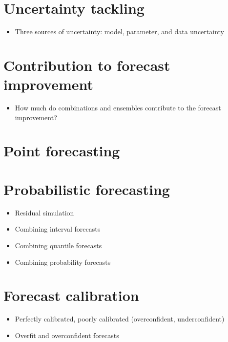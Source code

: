 \documentclass[11pt]{article}
\begin{document}
\section{Uncertainty tackling}
\begin{itemize}
\item Three sources of uncertainty: model, parameter, and data uncertainty
\end{itemize}


\section{Contribution to forecast improvement}
\begin{itemize}
\item How much do combinations and ensembles contribute to the forecast improvement?
\end{itemize}


\section{Point forecasting}


\section{Probabilistic forecasting}
\begin{itemize}
\item Residual simulation
\item Combining interval forecasts
\item Combining quantile forecasts
\item Combining probability forecasts
\end{itemize}


\section{Forecast calibration}
\begin{itemize}
\item Perfectly calibrated, poorly calibrated (overconfident, underconfident)
\item Overfit and overconfident forecasts
\end{itemize}





\nocite{*}
\end{document}
